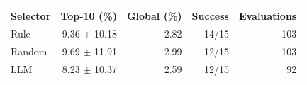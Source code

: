\begin{tabular}{lrrrr}
\toprule
Selector & Top-10 (\%) & Global (\%) & Success & Evaluations \\
\midrule
Rule & 9.36 $\pm$ 10.18 & 2.82 & 14/15 & 103 \\
Random & 9.69 $\pm$ 11.91 & 2.99 & 12/15 & 103 \\
LLM & 8.23 $\pm$ 10.37 & 2.59 & 12/15 & 92 \\
\bottomrule
\end{tabular}